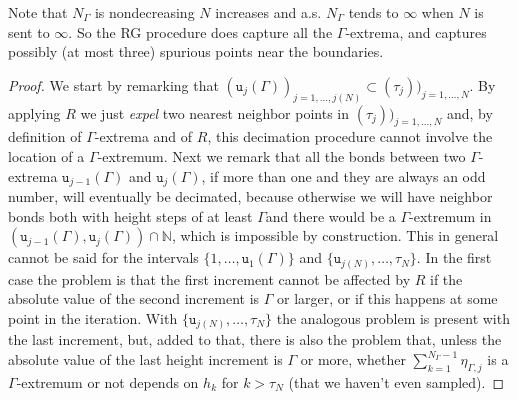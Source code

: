 \documentclass[10pt]{amsart}
\theoremstyle{definition}\newtheorem{defi}[theo]{Definition}\newtheorem{rema}[theo]{Remark}\newtheorem{exam}[theo]{Example}\newtheorem{exem}[theo]{Example}\newtheorem{nota}[theo]{Notation}
\newcommand{\bbN}{\mathbb{N}}
\newcommand{\gG}{\Gamma}
\renewcommand*\ss{\mathtt{u}}
\newcommand{\tu}{\ss}
\begin{document}
Note that $N_\gG$ is nondecreasing $N$ increases and a.s. $N_\gG$ tends to $\infty$ when $N$ is sent to $\infty$. So the RG procedure does capture all the $\gG$-extrema, and captures possibly (at most three) spurious points near the boundaries.




\begin{proof}
We start by remarking that $(\tu_j(\gG))_{j=1, \dots,j(N)} \subset (\tau_j))_{j=1, \dots, N}$. By applying $R$ we just \emph{expel} two nearest neighbor points in $(\tau_j))_{j=1, \dots, N}$ and, by definition of $\gG$-extrema and of $R$, this decimation procedure cannot involve the location of a $\gG$-extremum. Next we remark that all the bonds between two $\gG$-extrema $\tu_{j-1}(\gG)$ and $\tu_j(\gG)$, if more than one and they are always an odd number, will eventually be decimated, because otherwise we will have neighbor bonds both with height steps of at least $\gG$and there would be a $\gG$-extremum in $(\tu_{j-1}(\gG),\tu_j(\gG))\cap \bbN$, which is impossible by construction. This in general cannot be said for the intervals $\{1, \dots, \tu_1(\gG)\}$ and $\{\tu_{j(N)}, \dots, \tau_N\}$. In the first case the problem is that the first increment cannot be affected by $R$ if the absolute value of the second increment is $\gG$ or larger, or if this happens at some point in the iteration. With $\{\tu_{j(N)}, \dots, \tau_N\}$ the analogous problem is present with the last increment, but, added to that, there is also the problem that, unless the absolute value of the last height increment is $\gG$ or more, whether $\sum_{k=1}^{N_\gG-1} \eta_{\gG,j}$ is a $\gG$-extremum or not depends on $h_k$ for $k> \tau_N$ (that we haven't even sampled).
\end{proof}
\end{document}
